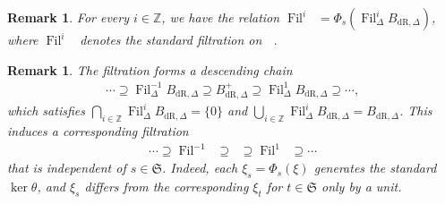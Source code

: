 \documentclass{amsart}
\newtheorem{remark}[proposition]{Remark}
\DeclareMathOperator{\Bdr}{B_{dR}}
\newcommand{\mBdrp}{B^+_{\mathrm{dR},\Delta}}
\DeclareMathOperator{\Bdrp}{B^+_{dR}}
\newcommand{\mBdr}{B_{\mathrm{dR},\Delta}}
\DeclareMathOperator{\Fil}{Fil}
\begin{document}
\begin{remark}
    For every $i \in \mathbb{Z}$, we have the relation $\Fil^i \Bdr = \Phi_s(\Fil^i_\Delta \mBdr)$, where $\Fil^i \Bdr$ denotes the standard filtration on $\Bdr$.
\end{remark}
    
\begin{remark}
    The filtration forms a descending chain
    \begin{align*}
        \cdots \supseteq \Fil^{-1}_\Delta \mBdr \supseteq \mBdrp \supseteq \Fil^1_\Delta \mBdr \supseteq \cdots,
    \end{align*}
    which satisfies $\bigcap_{i \in \mathbb{Z}} \Fil^i_\Delta \mBdr = \{0\}$ and $\bigcup_{i \in \mathbb{Z}} \Fil^i_\Delta \mBdr = \mBdr$. This induces a corresponding filtration 
    \begin{align*}
        \cdots \supseteq \Fil^{-1} \Bdr \supseteq \Bdrp \supseteq \Fil^1 \Bdr \supseteq \cdots
    \end{align*}
    that is independent of $s \in \mathfrak{S}$. Indeed, each $\xi_s = \Phi_s(\xi)$ generates the standard $\ker \theta$, and $\xi_s$ differs from the corresponding $\xi_t$ for $t \in \mathfrak{S}$ only by a unit.
\end{remark}
\end{document}
